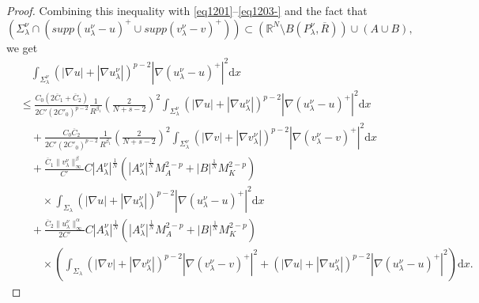 \documentclass[12pt]{amsart}
\theoremstyle{definition}
\theoremstyle{remark}
\theoremstyle{conclusion}
\theoremstyle{conjecture}
\numberwithin{equation}{section}
\newcommand{\R}{\mathbb{R}}
\begin{document}
\begin{proof}
Combining this inequality with \eqref{eq1201}--\eqref{eq1203-} and the fact that
$$\left(\Sigma^{\nu}_{\lambda}\cap (supp(u^{\nu}_{\lambda}-u)^+\cup supp(v^{\nu}_{\lambda}-v)^+)\right)\subset (\R^N \setminus B(P_\lambda^\nu,\overline{R}))\cup (A \cup B),$$
we get
\begin{align}\label{eq1204}
&\quad\int_{\Sigma^{\nu}_\lambda} (|\nabla u|+|\nabla u^{\nu}_{\lambda}|)^{p-2} |\nabla(u^{\nu}_{\lambda}-u)^+|^2 \mathrm{d}x \\
&\leq \frac{C_0(2\overline{C}_1+\overline{C}_2)}{2C'(2C'_0)^{p-2}} \frac{1}{R^{\beta_1}}\left(\frac{2}{N+s-2}\right)^2 \int_{\Sigma_\lambda^\nu}(|\nabla u|+|\nabla u^{\nu}_{\lambda}|)^{p-2} |\nabla (u^{\nu}_{\lambda}-u)^+|^2 \mathrm{d}x \nonumber\\
& \quad +\frac{ C_0\overline{C}_2}{2C'(2C'_0)^{p-2}}\frac{1}{R^{\beta_1}}\left(\frac{2}{N+s-2}\right)^2\int_{\Sigma_\lambda^\nu} (|\nabla v|+|\nabla v^{\nu}_{\lambda}|)^{p-2} |\nabla(v^{\nu}_{\lambda}-v )^+|^2 \mathrm{d}x  \nonumber\\
&\quad +\frac{\overline{C}_1\|v^\nu_\lambda\|^\beta_\infty }{C'}C |A_\lambda^\nu|^\frac{1}{N} \left(  |A_\lambda^\nu|^\frac{1}{N} M_A^{2-p}+|B|^\frac{1}{N} M_K^{2-p}\right)  \nonumber\\
&\quad \quad \times \int_{\Sigma_\lambda} (|\nabla u|+|\nabla u^{\nu}_{\lambda}|)^{p-2} |\nabla(u^{\nu}_{\lambda}-u )^+|^2 \mathrm{d}x \nonumber\\
 &\quad +\frac{\overline{C}_2\|u^\nu_\lambda\|^\alpha_\infty }{2C'}C |A_\lambda^\nu|^\frac{1}{N} \left(|A_\lambda^\nu|^\frac{1}{N} M_A^{2-p}+ |B|^\frac{1}{N} M_K^{2-p} \right)  \nonumber\\
&\quad \quad \times \left(\int_{\Sigma_\lambda} (|\nabla v|+|\nabla v^{\nu}_{\lambda}|)^{p-2} |\nabla(v^{\nu}_{\lambda}-v )^+|^2 +(|\nabla u|+|\nabla u^{\nu}_{\lambda}|)^{p-2} |\nabla(u^{\nu}_{\lambda}-u )^+|^2\right)\mathrm{d}x. \nonumber
\end{align}


\end{proof}
\end{document}
